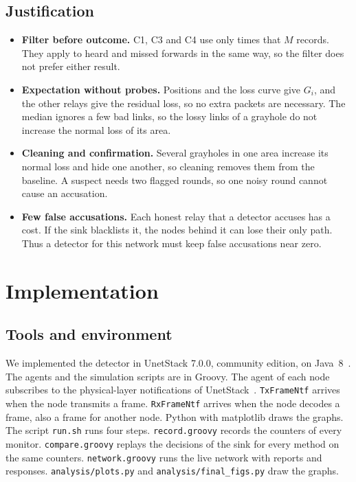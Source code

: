 \documentclass[11pt]{article}
\begin{document}
\subsection{Justification}\label{sec:prop-justify}
\begin{itemize}\setlength{\itemsep}{0pt}\setlength{\parskip}{0pt}\setlength{\topsep}{2pt}
\item \textbf{Filter before outcome.} C1, C3 and C4 use only times that $M$ records. They apply to heard and missed forwards in the same way, so the filter does not prefer either result.
\item \textbf{Expectation without probes.} Positions and the loss curve give $G_i$, and the other relays give the residual loss, so no extra packets are necessary. The median ignores a few bad links, so the lossy links of a grayhole do not increase the normal loss of its area.
\item \textbf{Cleaning and confirmation.} Several grayholes in one area increase its normal loss and hide one another, so cleaning removes them from the baseline. A suspect needs two flagged rounds, so one noisy round cannot cause an accusation.
\item \textbf{Few false accusations.} Each honest relay that a detector accuses has a cost. If the sink blacklists it, the nodes behind it can lose their only path. Thus a detector for this network must keep false accusations near zero.
\end{itemize}

\section{Implementation}\label{sec:impl}

\subsection{Tools and environment}\label{sec:impl-tools}
\noindent
We implemented the detector in UnetStack 7.0.0, community edition, on Java~8~\cite{chitre2014}.
The agents and the simulation scripts are in Groovy.
The agent of each node subscribes to the physical-layer notifications of UnetStack~\cite{unethandbook}.
\texttt{TxFrameNtf} arrives when the node transmits a frame.
\texttt{RxFrameNtf} arrives when the node decodes a frame, also a frame for another node.
Python with matplotlib draws the graphs.
The script \texttt{run.sh} runs four steps.
\texttt{record.groovy} records the counters of every monitor.
\texttt{compare.groovy} replays the decisions of the sink for every method on the same counters.
\texttt{network.groovy} runs the live network with reports and responses.
\texttt{analysis/plots.py} and \texttt{analysis/final\_figs.py} draw the graphs.
\end{document}
